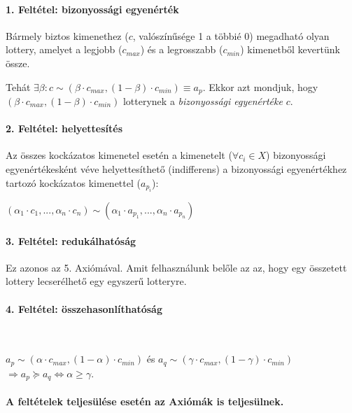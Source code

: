 \documentclass[a4paper,12pt]{article}
\begin{document}
\paragraph{1. Feltétel: bizonyossági egyenérték}
Bármely biztos kimenethez ($c$, valószínűsége 1 a többié 0) megadható olyan lottery, amelyet a legjobb ($c_{max}$) és a legrosszabb ($c_{min}$) kimenetből kevertünk össze. 

Tehát $\exists \beta: c \sim (\beta\cdot c_{max}, (1-\beta)\cdot c_{min}) \equiv a_p$. Ekkor azt mondjuk, hogy $(\beta\cdot c_{max}, (1-\beta)\cdot c_{min})$ lotterynek a \emph{bizonyossági egyenértéke} $c$.

\paragraph{2. Feltétel: helyettesítés}

Az összes kockázatos kimenetel esetén a kimenetelt ($\forall c_i \in X$) bizonyossági egyenértékesként véve helyettesíthető (indifferens) a bizonyossági egyenértékhez tartozó kockázatos kimenettel ($a_{p_i}$):

$(\alpha_1 \cdot c_1 , ... ,\alpha_n \cdot c_n ) \sim (\alpha_1 \cdot a_{p_1}, ... ,\alpha_n \cdot a_{p_n}) $


\paragraph{3. Feltétel: redukálhatóság}

Ez azonos az 5. Axiómával. Amit felhasználunk belőle az az, hogy egy összetett lottery lecserélhető egy egyszerű lotteryre.

\paragraph{4. Feltétel: összehasonlíthatóság}

\

$a_p \sim (\alpha \cdot c_{max}, (1-\alpha) \cdot c_{min})$ és 
$a_q \sim (\gamma \cdot c_{max}, (1-\gamma) \cdot c_{min})$ $\Rightarrow a_p \succeq a_q \Leftrightarrow \alpha \geq \gamma$. 

\paragraph{A feltételek teljesülése esetén az Axiómák is teljesülnek.}
\end{document}
